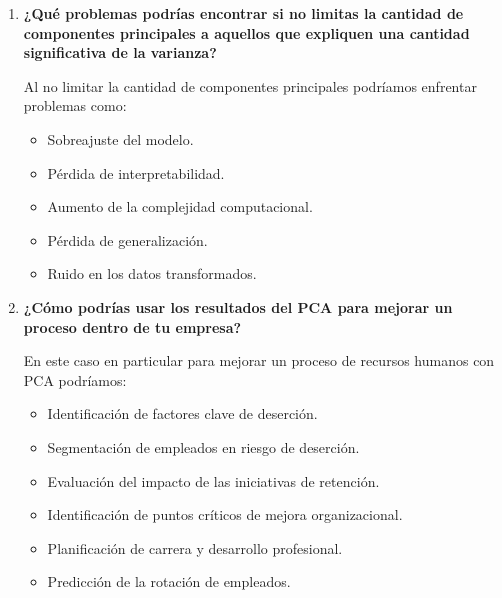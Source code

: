 \begin{enumerate}
    \item \textbf{¿Qué problemas podrías encontrar si no limitas la cantidad de componentes principales a aquellos que expliquen una cantidad significativa de la varianza?}

    Al no limitar la cantidad de componentes principales podríamos enfrentar problemas como:
    \begin{itemize}
        \item Sobreajuste del modelo.
        \item Pérdida de interpretabilidad.
        \item Aumento de la complejidad computacional.
        \item Pérdida de generalización.
        \item Ruido en los datos transformados.
    \end{itemize}

    \item \textbf{¿Cómo podrías usar los resultados del PCA para mejorar un proceso dentro de tu empresa?}

    En este caso en particular para mejorar un proceso de recursos humanos con PCA podríamos:
    \begin{itemize}
        \item Identificación de factores clave de deserción.
        \item Segmentación de empleados en riesgo de deserción.
        \item Evaluación del impacto de las iniciativas de retención.
        \item Identificación de puntos críticos de mejora organizacional.
        \item Planificación de carrera y desarrollo profesional.
        \item Predicción de la rotación de empleados.
    \end{itemize}
\end{enumerate}
